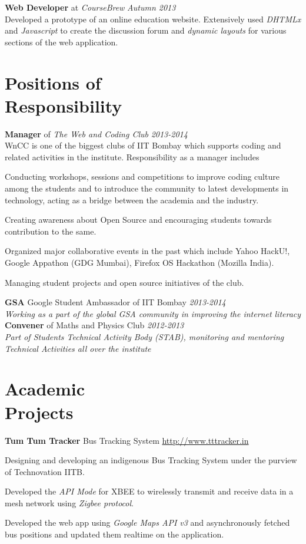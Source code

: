 \documentclass[margin,11pt]{resume}
\begin{document}
\begin{resume}
\textbf{Web Developer} at \emph{CourseBrew} \hfill \emph{Autumn 2013} \\
Developed a prototype of an online education website. Extensively used \emph{DHTMLx} and \emph{Javascript} to create the discussion forum and \emph{dynamic layouts} for various sections of the web application.

\section{\mysidestyle Positions of\\Responsibility } 


\textbf{Manager} of \emph{The Web and Coding Club} \hfill \emph{2013-2014}\\
WnCC is one of the biggest clubs of IIT Bombay which supports coding and related activities in the institute. Responsibility as a manager includes
\begin{list2}
\item Conducting workshops, sessions and competitions to improve coding culture among the students and to introduce the community to latest developments in technology, acting as a bridge between the academia and the industry. 
\item Creating awareness about Open Source and encouraging students towards contribution to the same. 
\item Organized major collaborative events in the past which include Yahoo HackU!, Google Appathon (GDG Mumbai), Firefox OS Hackathon (Mozilla India). 
\item Managing student projects and open source initiatives of the club. 
\end{list2}
\textbf{GSA} Google Student Ambassador of IIT Bombay \hfill \emph{2013-2014} \\
\emph{Working as a part of the global GSA community in improving the internet literacy}
\textbf{Convener} of Maths and Physics Club \hfill \emph{2012-2013} \\
\emph{Part of Students Technical Activity Body (STAB), monitoring and mentoring Technical Activities all over the institute}

\vspace{20mm}
\section{\mysidestyle Academic\\Projects}

\textbf{Tum Tum Tracker} \hfill Bus Tracking System \hfill
    \url{http://www.tttracker.in}
\begin{list2}
\item Designing and developing an indigenous Bus Tracking System under the purview of Technovation IITB.
\item Developed the \emph{API Mode} for XBEE to wirelessly transmit and receive data in a mesh network using \emph{Zigbee protocol}.
\item Developed the web app using \emph{Google Maps API v3} and asynchronously fetched bus positions and updated them realtime  on the application.
\end{list2}


\end{resume}
\end{document}
